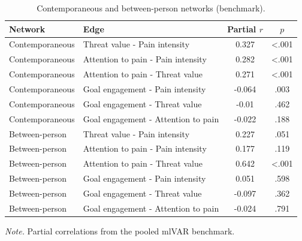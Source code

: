 \begin{table}[!htbp]
\raggedright
\caption{Contemporaneous and between-person networks (benchmark).}
\label{tab:sup-contemporaneous-between}
\footnotesize
\begingroup
\setlength{\tabcolsep}{4pt}
\renewcommand{\arraystretch}{1.08}
\noindent
\begin{tabular*}{\textwidth}{@{\extracolsep{\fill}}llcc@{}}
\toprule
Network & Edge & Partial $r$ & $p$ \\
\midrule
Contemporaneous & Threat value - Pain intensity & 0.327 & <.001 \\
Contemporaneous & Attention to pain - Pain intensity & 0.282 & <.001 \\
Contemporaneous & Attention to pain - Threat value & 0.271 & <.001 \\
Contemporaneous & Goal engagement - Pain intensity & -0.064 & .003 \\
Contemporaneous & Goal engagement - Threat value & -0.01 & .462 \\
Contemporaneous & Goal engagement - Attention to pain & -0.022 & .188 \\
Between-person & Threat value - Pain intensity & 0.227 & .051 \\
Between-person & Attention to pain - Pain intensity & 0.177 & .119 \\
Between-person & Attention to pain - Threat value & 0.642 & <.001 \\
Between-person & Goal engagement - Pain intensity & 0.051 & .598 \\
Between-person & Goal engagement - Threat value & -0.097 & .362 \\
Between-person & Goal engagement - Attention to pain & -0.024 & .791 \\
\bottomrule
\end{tabular*}
\par\vspace{3pt}\noindent\parbox{\textwidth}{\footnotesize\textit{Note.} Partial correlations from the pooled mlVAR benchmark.}
\endgroup
\end{table}
